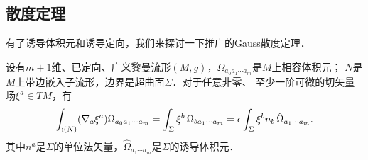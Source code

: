 \subsection{散度定理}
有了诱导体积元和诱导定向，我们来探讨一下推广的Gauss散度定理．

\begin{theorem}\label{chsm:thm_Gauss-Divergence}
设有$m+1$维、已定向、广义黎曼流形$(M,g)$，${\Omega}_{a_0 a_1 \cdots a_{m}}$是$M$上相容体积元；
$N$是$M$上带边嵌入子流形，边界是超曲面$\Sigma$．对于任意非零、
至少一阶可微的切矢量场$\xi^a\in TM$，有
\begin{equation}\label{chsm:eqn_Gauss-Divergence}
    \int_{{\rm i}(N)} (\nabla_a \xi^a) {\Omega}_{a_0 a_1 \cdots a_{m}}
    =\int_{\Sigma} \xi^b \, \Omega_{b a_1 \cdots a_{m} }
    =\epsilon \int_{\Sigma} \xi^b n_b \, \hat{\Omega}_{a_1 \cdots a_{m} } .
\end{equation}
其中$n^a$是$\Sigma$的单位法矢量，$\hat{\Omega}_{a_1 \cdots a_{m} }$是$\Sigma$的诱导体积元．
\end{theorem}
